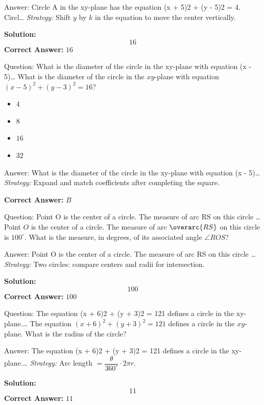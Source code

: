 \documentclass{beamer}
\begin{document}
\begin{frame}{Answer: Circle A in the xy-plane has the equation (x + 5)2 + (y - 5)2 = 4. Circl…}
\textit{Strategy:} Shift $y$ by $k$ in the equation to move the center vertically.

\textbf{Solution:}
\[ \boxed{16} \]
\textbf{Correct Answer:} \( \boxed{16} \)

\end{frame}
\begin{frame}{Question: What is the diameter of the circle in the xy-plane with equation (x - 5)…}
What is the diameter of the circle in the $xy$-plane with equation $(x - 5)^2 + (y - 3)^2 = 16$?
\begin{itemize}
    \item[\textbf{A.}] $4$
    \item[\textbf{B.}] $8$
    \item[\textbf{C.}] $16$
    \item[\textbf{D.}] $32$
\end{itemize}
\end{frame}
\begin{frame}{Answer: What is the diameter of the circle in the xy-plane with equation (x - 5)…}
\textit{Strategy:} Expand and match coefficients after completing the square.

\textbf{Correct Answer:} \( \boxed{B} \)

\end{frame}
\begin{frame}{Question: Point O is the center of a circle. The measure of arc RS on this circle …}
Point $O$ is the center of a circle. The measure of arc $\overarc{RS}$ on this circle is $100^\circ$. What is the measure, in degrees, of its associated angle $\angle ROS$?
\end{frame}
\begin{frame}{Answer: Point O is the center of a circle. The measure of arc RS on this circle …}
\textit{Strategy:} Two circles: compare centers and radii for intersection.

\textbf{Solution:}
\[ \boxed{100} \]
\textbf{Correct Answer:} \( \boxed{100} \)

\end{frame}
\begin{frame}{Question: The equation (x + 6)2 + (y + 3)2 = 121 defines a circle in the xy-plane.…}
The equation $(x + 6)^2 + (y + 3)^2 = 121$ defines a circle in the $xy$-plane. What is the radius of the circle?
\end{frame}
\begin{frame}{Answer: The equation (x + 6)2 + (y + 3)2 = 121 defines a circle in the xy-plane.…}
\textit{Strategy:} Arc length $=\dfrac{\theta}{360^\circ}\cdot 2\pi r$.

\textbf{Solution:}
\[ \boxed{11} \]
\textbf{Correct Answer:} \( \boxed{11} \)

\end{frame}
\end{document}
